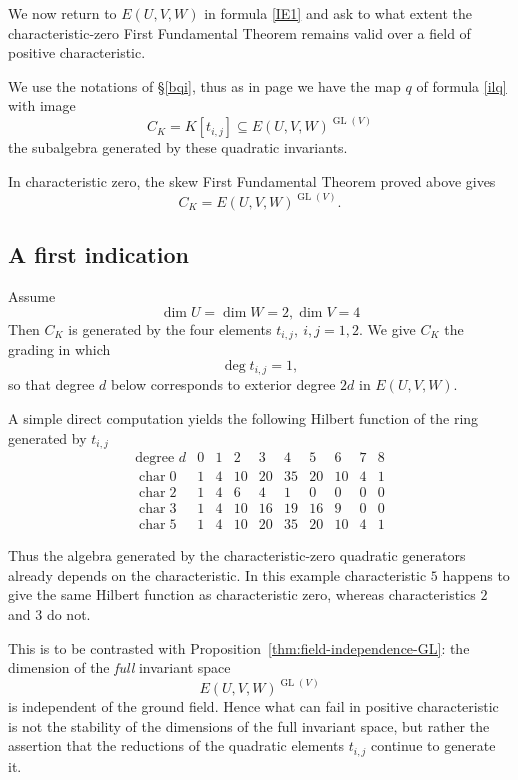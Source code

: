 \documentclass[10pt]{amsart}
\theoremstyle{definition}
\theoremstyle{remark}
\newcommand{\GL}{\operatorname{GL}}
\begin{document}
We now return to
$
E(U,V,W)
$ in formula \eqref{IE1}
   and ask to what extent the characteristic-zero First Fundamental
Theorem remains valid over a field of positive characteristic.\medskip

We use the notations of \S \ref{bqi},
thus as in page \pageref{ilq} we have
  the map $q$  of formula \eqref{ilq} with image
\[
C_K
=
K[t_{i,j}]
\subseteq
E(U,V,W)^{\GL(V)}
\]
  the subalgebra generated by these quadratic invariants.\smallskip

In characteristic zero, the skew First Fundamental Theorem proved
above gives
\[
C_K
=
E(U,V,W)^{\GL(V)}.
\] 


\subsection{A first indication}  Assume
\[
\dim U=\dim W=2, \dim V=4
\]
Then \(C_K\) is generated by the four elements \(t_{i,j},\ i,j=1,2\).
We give \(C_K\) the grading in which
\[
\deg t_{i,j}=1,
\]
so that degree \(d\) below corresponds to exterior degree \(2d\) in
\(E(U,V,W)\).\smallskip

A simple direct computation yields 
the following Hilbert function of the ring generated by $t_{i,j}$
\[
\begin{array}{c|ccccccccc}
\text{degree } d
&0&1&2&3&4&5&6&7&8\\
\hline
\operatorname{char}0
&1&4&10&20&35&20&10&4&1\\
\operatorname{char}2
&1&4&6&4&1&0&0&0&0\\
\operatorname{char}3
&1&4&10&16&19&16&9&0&0\\
\operatorname{char}5
&1&4&10&20&35&20&10&4&1
\end{array}
\]
 

Thus the algebra generated by the characteristic-zero quadratic
generators already depends on the characteristic.  In this example
characteristic \(5\) happens to give the same Hilbert function as
characteristic zero, whereas characteristics \(2\) and \(3\) do not.\medskip

This is to be contrasted with Proposition~\ref{thm:field-independence-GL}: the dimension of the \emph{full} invariant space
\[
E(U,V,W)^{\GL(V)}
\]
is independent of the   ground field.  Hence what can fail in
positive characteristic is not the stability of the dimensions of the full invariant
space, but rather the assertion that the reductions of the quadratic
elements \(t_{i,j}\) continue to generate it.\smallskip
\end{document}
